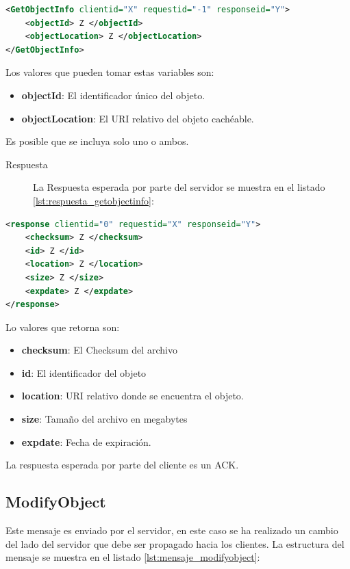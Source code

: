 \begin{lstlisting}[language=XML,caption={Mensaje de GetObjectInfo},label={lst:mensaje_getobjectinfo}]
<GetObjectInfo clientid="X" requestid="-1" responseid="Y"> 
	<objectId> Z </objectId>
	<objectLocation> Z </objectLocation>
</GetObjectInfo>
\end{lstlisting}

Los valores que pueden tomar estas variables son:

\begin{itemize}
\item \textbf{objectId}: El identificador único del objeto.
\item \textbf{objectLocation}: El URI relativo del objeto cachéable.
\end{itemize}

Es posible que se incluya solo uno o ambos.

\begin{description}
\item[Respuesta] La Respuesta esperada por parte del servidor se muestra en el listado \ref{lst:respuesta_getobjectinfo}:
\end{description}

\begin{lstlisting}[language=XML,caption={Mensaje de Respuesta de GetObjectInfo},label={lst:respuesta_getobjectinfo}]
<response clientid="0" requestid="X" responseid="Y"> 
	<checksum> Z </checksum>
	<id> Z </id>
	<location> Z </location>
	<size> Z </size>
	<expdate> Z </expdate>
</response>
\end{lstlisting}

Lo valores que retorna son:

\begin{itemize}
\item \textbf{checksum}:  El Checksum del archivo
\item \textbf{id}: El identificador del objeto
\item \textbf{location}: URI relativo donde se encuentra el objeto.
\item \textbf{size}: Tamaño del archivo en megabytes
\item \textbf{expdate}: Fecha de expiración.
\end{itemize}


La respuesta esperada por parte del cliente es un ACK.

\subsection{ModifyObject}
Este mensaje es enviado por el servidor, en este caso se ha realizado un cambio del lado del servidor que debe ser propagado hacia los clientes. La estructura del mensaje se muestra en el listado \ref{lst:mensaje_modifyobject}:

